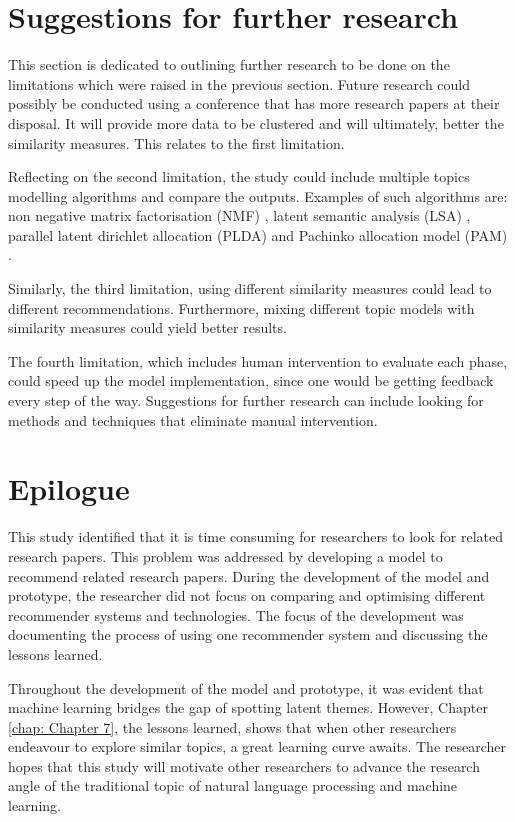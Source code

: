 \section{Suggestions for further research}

This section is dedicated to outlining further research to be done on the limitations which were raised in the previous section. Future research could possibly be conducted using a conference that has more research papers at their disposal. It will provide more data to be clustered and will ultimately, better the similarity measures. This relates to the first limitation.

Reflecting on the second limitation, the study could include multiple topics modelling algorithms and compare the outputs. Examples of such algorithms are: non negative matrix factorisation (NMF) \cite{Purpura2018}, latent semantic analysis (LSA) \cite{Qomariyah2019}, parallel latent dirichlet allocation (PLDA) \cite{Mukherjee2019} and Pachinko allocation model (PAM) \cite{Koltcov2021}.

Similarly, the third limitation, using different similarity measures could lead to different recommendations. Furthermore, mixing different topic models with similarity measures could yield better results.

The fourth limitation, which includes human intervention to evaluate each phase, could speed up the model implementation, since one would be getting feedback every step of the way. Suggestions for further research can include looking for methods and techniques that eliminate manual intervention.

\section{Epilogue}

This study identified that it is time consuming for researchers to look for related research papers. This problem was addressed by developing a model to recommend related research papers. During the development of the model and prototype, the researcher did not focus on comparing and optimising different recommender systems and technologies. The focus of the development was documenting the process of using one recommender system and discussing the lessons learned.

Throughout the development of the model and prototype, it was evident that machine learning bridges the gap of spotting latent themes. However, Chapter \ref{chap: Chapter 7}, the lessons learned, shows that when other researchers endeavour to explore similar topics, a great learning curve awaits. The researcher hopes that this study will motivate other researchers to advance the research angle of the traditional topic of natural language processing and machine learning. 